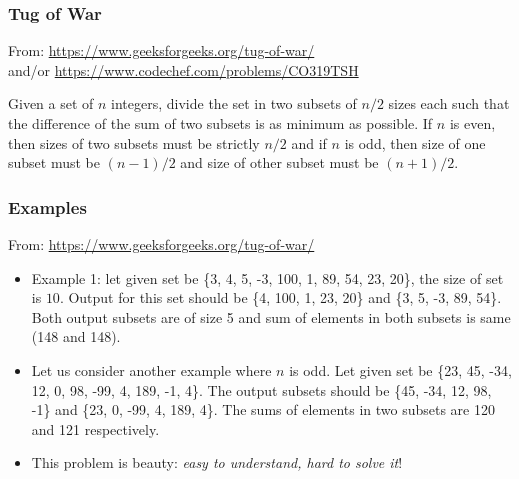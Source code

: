 \documentclass{beamer}
\begin{document}
\begin{frame}[fragile] 

	\frametitle{Tug of War} 

From: \textcolor{blue}{\url{https://www.geeksforgeeks.org/tug-of-war/}}\\
and/or \textcolor{blue}{\url{https://www.codechef.com/problems/CO319TSH}}

\begin{block}{}

Given a set of $n$ integers, divide the set in two subsets of $n/2$ sizes each such that the difference of the sum of two subsets is as minimum as possible. If $n$ is even, then sizes of two subsets must be strictly $n/2$ and if $n$ is odd, then size of one subset must be $(n-1)/2$ and size of other subset must be $(n+1)/2$.
\end{block}

\end{frame}


\begin{frame}[fragile] 

	\frametitle{Examples} 

From: \textcolor{blue}{\url{https://www.geeksforgeeks.org/tug-of-war/}}

\begin{block}{}
  \begin{itemize}
  \setlength\itemsep{7pt}

  \item Example 1: let given set be \{3, 4, 5, -3, 100, 1, 89, 54, 23, 20\}, the size of set is $10$. Output for this set should be \{4, 100, 1, 23, 20\} and \{3, 5, -3, 89, 54\}. Both output subsets are of size 5 and sum of elements in both subsets is same (148 and 148). 

  \item Let us consider another example where $n$ is odd. Let given set be \{23, 45, -34, 12, 0, 98, -99, 4, 189, -1, 4\}. The output subsets should be \{45, -34, 12, 98, -1\} and \{23, 0, -99, 4, 189, 4\}. The sums of elements in two subsets are 120 and 121 respectively.


\item This problem is beauty: \emph{easy to understand, hard to solve it}!

  \end{itemize}
 \end{block}

\end{frame}
\end{document}
